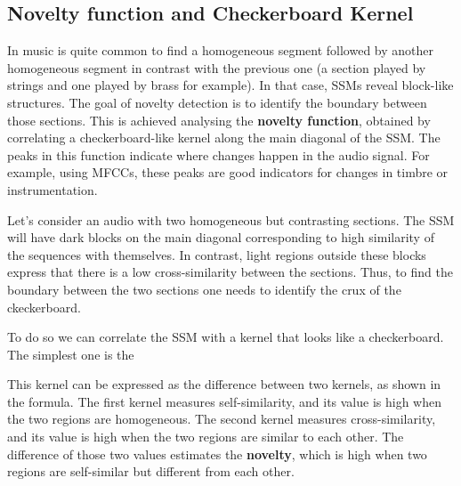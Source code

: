 \documentclass[a4paper, 9pt, twocolumn]{extarticle}
\begin{document}
\subsection{Novelty function and Checkerboard  Kernel}
\label{subsection:noveltyKernel}

In music is quite common to find a homogeneous segment followed by another homogeneous segment in contrast with the previous one (a section played by strings and one played by brass for example). In that case, SSMs reveal block-like structures. The goal of novelty detection is to identify the boundary between those sections. This is achieved analysing the \textbf{novelty function}, obtained  by correlating a checkerboard-like kernel along the main diagonal of the SSM. The peaks in this function indicate where changes happen in the audio signal. For example, using MFCCs, these peaks are good indicators for changes in timbre or instrumentation.

Let's consider an audio with two homogeneous but contrasting sections. The SSM will have dark blocks on the main diagonal  corresponding to high similarity of the sequences with themselves. In contrast, light regions outside these blocks express that there is a low cross-similarity between the sections. Thus, to find the boundary between the two sections one needs to identify the crux of the ckeckerboard.

To do so we can correlate the SSM with a kernel that looks like a checkerboard. The simplest one is the 


This kernel can be expressed as the difference between two kernels, as shown in the formula. The first kernel measures self-similarity, and its value is high when the two regions are homogeneous. The second kernel measures cross-similarity, and its value is high when the two regions are similar to each other. The difference of those two values estimates the \textbf{novelty}, which is high when two regions are self-similar but different from each other. 
\end{document}
